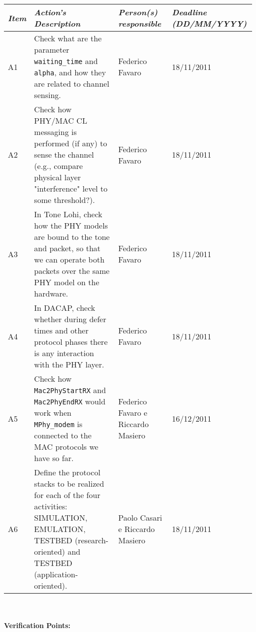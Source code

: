 \documentclass[11pt,journal,draftclsnofoot,onecolumn,twoside,letterpaper]{IEEEtran}
\theoremstyle{definition} \newtheorem{definition}[]{Definition}
\theoremstyle{theorem} \newtheorem{theorem}[]{Theorem}
\begin{document}
\begin{tabular}{|p{}|p{}|p{}|p{}|}
\hline
{\it Item} & {\it Action's Description} & {\it Person(s) responsible} & {\it Deadline (DD/MM/YYYY)}\\
\hline
A1 & Check what are the parameter {\tt waiting\_time} and {\tt alpha}, and how they are related to channel sensing. & Federico Favaro & 18/11/2011\\ 
A2 & Check how PHY/MAC CL messaging is performed (if any) to sense the channel (e.g., compare physical layer "interference" level to some threshold?). & Federico Favaro & 18/11/2011\\ 
A3 & In Tone Lohi, check how the PHY models are bound to the tone and packet, so that we can operate both packets over the same PHY model on the hardware. & Federico Favaro & 18/11/2011\\
A4 & In DACAP, check whether during defer times and other protocol phases there is any interaction with the PHY layer. & Federico Favaro & 18/11/2011\\
A5 & Check how {\tt Mac2PhyStartRX} and {\tt Mac2PhyEndRX} would work when {\tt MPhy\_modem} is connected to the MAC protocols we have so far. & Federico Favaro e Riccardo Masiero & 16/12/2011\\
A6 & Define the protocol stacks to be realized for each of the four activities: SIMULATION, EMULATION, TESTBED (research-oriented) and TESTBED (application-oriented). & Paolo Casari e Riccardo Masiero & 18/11/2011\\
\hline
\end{tabular}
\ \\
\ \\
{\bf Verification Points:}
\end{document}
